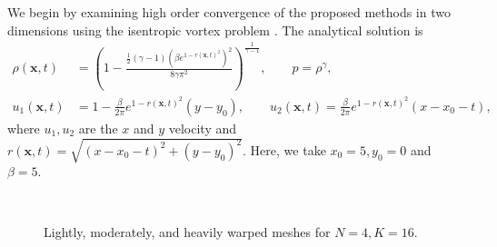 \documentclass[review,onefignum,onetabnum,final]{siamart171218}
\newcommand{\LRp}[1]{\left( #1 \right)}
\begin{document}
We begin by examining high order convergence of the proposed methods in two dimensions using the isentropic vortex problem \cite{shu1998essentially, crean2017high}.  The analytical solution is 
\begin{align}
\rho(\bm{x},t) &= \LRp{1 - \frac{\frac{1}{2}(\gamma-1)(\beta e^{1-r(\bm{x},t)^2})^2}{8\gamma \pi^2}}^{\frac{1}{\gamma-1}}, \qquad p = \rho^{\gamma},\\
u_1(\bm{x},t) &= 1 - \frac{\beta}{2\pi} e^{1-r(\bm{x},t)^2}(y-y_0), \qquad u_2(\bm{x},t) = \frac{\beta}{2\pi} e^{1-r(\bm{x},t)^2}(x-x_0-t),\nonumber
\end{align}
where $u_1, u_2$ are the $x$ and $y$ velocity and $r(\bm{x},t) = \sqrt{(x-x_0-t)^2 + (y-y_0)^2}$.  Here, we take $x_0 = 5, y_0 = 0$ and $\beta = 5$.  

\begin{figure}
\centering
{}
\hspace{1em}
\\
\caption{Lightly, moderately, and heavily warped meshes for $N=4, K= 16$.  }
\label{fig:warp2d}
\end{figure}
\end{document}
